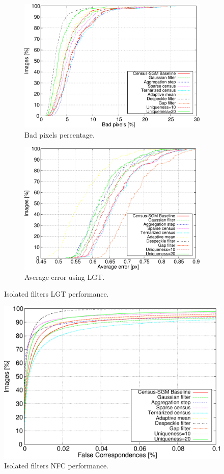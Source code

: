 \begin{figure}[h!]
      \centering
      \begin{subfigure}[h]{\textwidth}
	\centering
	\includegraphics[width=\textwidth, height=0.5\textwidth, trim=0 0 0 0,clip]{filt_bpp}
	
	\caption{ Bad pixels percentage.}
	\label{fig:cp03_isolated_LGT_bpp} 
      \end{subfigure}%
      
      \begin{subfigure}[h]{\textwidth}
	\centering
	\includegraphics[width=\textwidth, height=0.5\textwidth, trim=0 0 0 0,clip]{filt_avg}
	\caption{ Average error using LGT. }
	\label{fig:cp03_isolated_LGT_avg}
      \end{subfigure}%
      \caption{ Isolated filters LGT performance. }
\end{figure}

\begin{figure}[h!]
  \centering
  \includegraphics[width=\textwidth, height=0.5\textwidth, trim=0 0 0 0,clip]{filt_nfc_perc}
  \caption{ Isolated filters NFC performance.}
  \label{fig:cp03_isolated_NFC}
\end{figure}%

